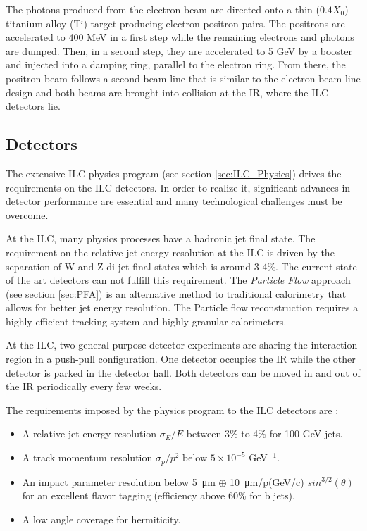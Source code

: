 The photons produced from the electron beam are directed onto a thin ($0.4 X_0$) titanium alloy (Ti) target producing elec\-tron\--positron pairs. The positrons are accelerated to 400 MeV in a first step while the remaining electrons and photons are dumped. Then, in a second step, they are accelerated to 5 GeV by a booster and injected into a damping ring, parallel to the electron ring. From there, the positron beam follows a second beam line that is similar to the electron beam line design and both beams are brought into collision at the IR, where the ILC detectors lie.

\subsection{Detectors}

The extensive ILC physics program (see section \ref{sec:ILC_Physics}) drives the requirements on the ILC detectors. In order to realize it, significant advances in detector performance are essential and many technological challenges must be overcome.

At the ILC, many physics processes have a hadronic jet final state. The requirement on the relative jet energy resolution at the ILC is driven by the separation of W and Z di-jet final states which is around 3-4\%. The current state of the art detectors can not fulfill this requirement. The \textit{Particle Flow} approach (see section \ref{sec:PFA}) is an alternative method to traditional calorimetry that allows for better jet energy resolution. The Particle flow reconstruction requires a highly efficient tracking system and highly granular calorimeters.

At the ILC, two general purpose detector experiments are sharing the interaction region in a push-pull configuration. One detector occupies the IR while the other detector is parked in the detector hall. Both detectors can be moved in and out of the IR periodically every few weeks.

The requirements imposed by the physics program to the ILC detectors are \cite{ILC_TDR_Vol4}:
\begin{itemize}
  \item A relative jet energy resolution $\sigma_{E}/E$ between 3\% to 4\% for 100 GeV jets.
  \item A track momentum resolution $\sigma_{p}/p^2$ below $5 \times 10^{-5}$ GeV$^{-1}$.
  \item An impact parameter resolution below \SI{5}{\micro\meter} $\oplus$ \SI{10}{\micro\meter}/p(GeV/c) $sin^{3/2}(\theta)$ for an excellent flavor tagging (efficiency above 60\% for b jets).
  \item A low angle coverage for hermiticity.
\end{itemize}

